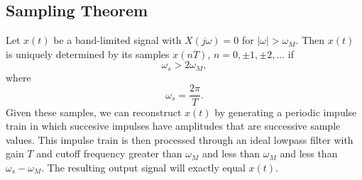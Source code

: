 \subsection{Sampling Theorem}
Let $x(t)$ be a band-limited signal with
$X(j\omega) = 0$ for $|\omega| > \omega_M$.
Then $x(t)$ is uniquely determined by its samples
$x(nT)$, $n = 0, \pm 1, \pm 2, \dots$ if
\begin{equation}
    \omega_s > 2 \omega_M,
\end{equation}
where
\begin{equation}
    \omega_s = \frac{2\pi}{T}.
\end{equation}
Given these samples, we can reconstruct
$x(t)$ by generating a periodic impulse
train in which succesive impulses have amplitudes that are
successive sample values. This impulse train is
then processed through an ideal lowpass filter
with gain $T$ and cutoff frequency greater than $\omega_M$ and
less than $\omega_M$ and less than $\omega_s - \omega_M$.
The resulting output signal will exactly equal $x(t)$.